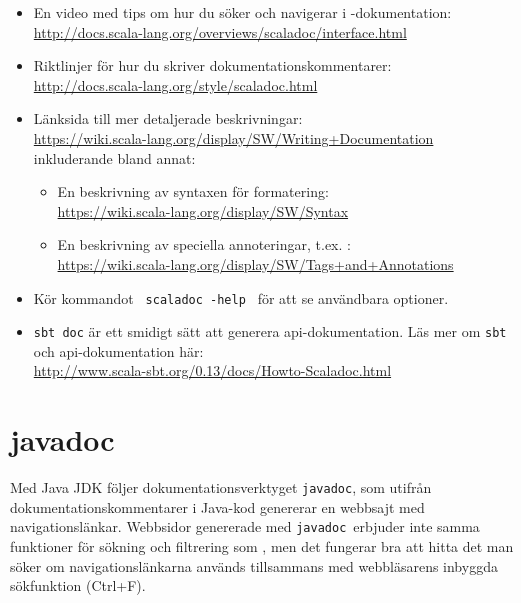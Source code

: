 \begin{itemize}[leftmargin=*]

\item En video med tips om hur du söker och navigerar i \scaladoc-dokumentation: 
\\
\url{http://docs.scala-lang.org/overviews/scaladoc/interface.html}

\item
Riktlinjer för hur du skriver dokumentationskommentarer: \\
\url{http://docs.scala-lang.org/style/scaladoc.html}

\item Länksida till mer detaljerade beskrivningar: \\
\url{https://wiki.scala-lang.org/display/SW/Writing+Documentation} \\
inkluderande bland annat:

\begin{itemize}[nolistsep]
\item En beskrivning av syntaxen för formatering: \\
\url{https://wiki.scala-lang.org/display/SW/Syntax} 

\item En beskrivning av speciella annoteringar, t.ex. : \\
\url{https://wiki.scala-lang.org/display/SW/Tags+and+Annotations} 

\end{itemize}

\item Kör kommandot \texttt{ scaladoc -help } för att se användbara optioner.

\item \texttt{sbt doc} är ett smidigt sätt att generera api-dokumentation. Läs mer om \texttt{sbt} och api-dokumentation här: \\
\url{http://www.scala-sbt.org/0.13/docs/Howto-Scaladoc.html}


\end{itemize}

\clearpage

\section{javadoc}
\newcommand{\javadoc}{\texttt{javadoc}}


Med Java JDK följer dokumentationsverktyget \javadoc, som utifrån dokumentationskommentarer i Java-kod genererar en webbsajt med navigationslänkar. Webbsidor genererade med \javadoc\ erbjuder inte samma funktioner för sökning och filtrering som \scaladoc, men det fungerar bra att hitta det man söker om navigationslänkarna används tillsammans med webbläsarens inbyggda sökfunktion (Ctrl+F).

